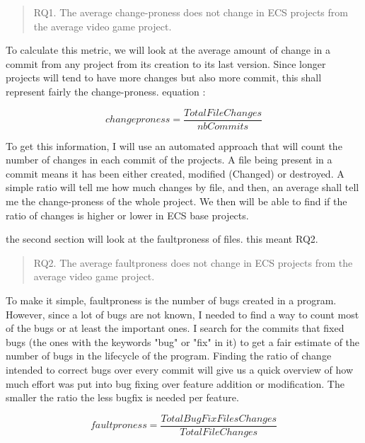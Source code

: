 \documentclass{IEEEcsmag}
\begin{document}
\begin{quote}
    RQ1. The average change-proness does not change in ECS projects from the average video game project.
\end{quote}

To calculate this metric, we will look at the average amount of change in a commit from any project from its creation to its last version. Since longer projects will tend to have more changes but also more commit, this shall represent fairly the change-proness.
equation : 

\begin{equation}
    changeproness = \frac{TotalFileChanges}{nbCommits} 
\end{equation}

To get this information, I will use an automated approach that will count the number of changes in each commit of the projects. A file being present in a commit means it has been either created, modified (Changed) or destroyed. A simple ratio will tell me how much changes by file, and then, an average shall tell me the change-proness of the whole project. We then will be able to find if the ratio of changes is higher or lower in ECS base projects. 

the second section will look at the faultproness of files. this meant RQ2.

\begin{quote}
    RQ2. The average faultproness does not change in ECS projects from the average video game project.
\end{quote}

To make it simple, faultproness is the number of bugs created in a program. However, since a lot of bugs are not known, I needed to find a way to count most of the bugs or at least the important ones. I search for the commits that fixed bugs (the ones with the keywords "bug" or "fix" in it) to get a fair estimate of the number of bugs in the lifecycle of the program. Finding the ratio of change intended to correct bugs over every commit will give us a quick overview of how much effort was put into bug fixing over feature addition or modification. The smaller the ratio the less bugfix is needed per feature.

\begin{equation}
    faultproness = \frac{TotalBugFixFilesChanges}{TotalFileChanges}
\end{equation}


\end{document}
